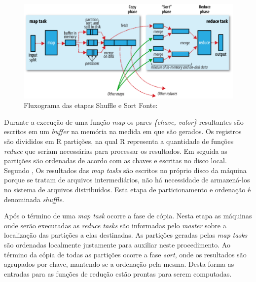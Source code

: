 \begin{figure}[ht!]
	\centering
	\includegraphics[keepaspectratio=true,scale=0.6]
	  {figuras/shuffle.eps}
	\caption[Fluxograma das etapas Shuffle e Sort]{Fluxograma das etapas Shuffle e Sort
	\protect\linebreak Fonte: \cite{white2012}}
	\label{fig-shuffle}
\end{figure}
\FloatBarrier

Durante a execução de uma função \textit{map} os pares \textit{\{chave, valor\}} resultantes são escritos em um \textit{buffer} na memória na medida em que são gerados. Os registros são divididos em R partições, na qual R representa a quantidade de funções \textit{reduce} que seriam necessárias para processar os resultados. Em seguida as partições são ordenadas de acordo com as chaves e escritas no disco local. Segundo , Os resultados das \textit{map tasks} são escritos no próprio disco da máquina porque se tratam de arquivos intermediários, não há necessidade de armazená-los no sistema de arquivos distribuídos. Esta etapa de particionamento e ordenação é denominada \textit{shuffle}.

Após o término de uma \textit{map task} ocorre a fase de cópia. Nesta etapa as máquinas onde serão executadas as \textit{reduce tasks} são informadas pelo \textit{master} sobre a localização das partições a elas destinadas. As partições geradas pelas \textit{map tasks} são ordenadas localmente justamente para auxiliar neste procedimento. Ao término da cópia de todas as partições ocorre a fase \textit{sort}, onde os resultados são agrupados por chave, mantendo-se a ordenação pela mesma. Desta forma as entradas para as funções de redução estão prontas para serem computadas.

